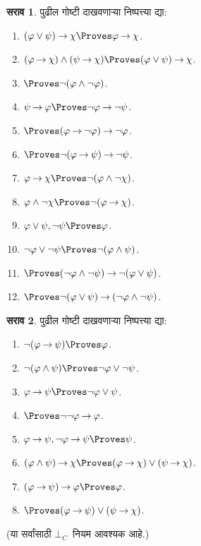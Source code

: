 \documentclass[11pt,a4paper,openany]{book}
\theoremstyle{definition}
\newtheorem{prob}{सराव}[chapter]
\newcommand{\lif}{\mathbin{\to}}
\newcommand{\lfalse}{\bot}
\newcommand{\FalseCl}{\ensuremath{\lfalse_C}}
\begin{document}
\begin{prob}
पुढील गोष्टी दाखवणाऱ्या निष्पत्त्या द्या:
\begin{enumerate}
\item $(\varphi \lor \psi) \lif \chi \Proves \varphi \lif \chi$.
\item $(\varphi \lif \chi) \land (\psi \lif \chi) \Proves (\varphi \lor \psi) \lif \chi$.
\item $\Proves \lnot(\varphi \land \lnot \varphi)$.
\item $\psi \lif \varphi \Proves \lnot \varphi \lif \lnot \psi$.
\item $\Proves (\varphi \lif \lnot \varphi) \lif \lnot \varphi$.
\item $\Proves \lnot(\varphi \lif \psi) \lif \lnot \psi$.
\item $\varphi \lif \chi \Proves \lnot (\varphi \land \lnot \chi)$.
\item $\varphi \land \lnot \chi \Proves \lnot (\varphi \lif \chi)$.
\item $\varphi \lor \psi, \lnot \psi \Proves \varphi$.
\item $\lnot \varphi \lor \lnot \psi \Proves \lnot(\varphi \land \psi)$.
\item $\Proves (\lnot \varphi \land \lnot \psi) \lif\lnot(\varphi \lor \psi)$.
\item $\Proves \lnot(\varphi \lor \psi) \lif (\lnot \varphi \land \lnot \psi)$.
\end{enumerate}
\end{prob}

\begin{prob}
पुढील गोष्टी दाखवणाऱ्या निष्पत्त्या द्या:
\begin{enumerate}
\item $\lnot(\varphi \lif \psi) \Proves \varphi$.
\item $\lnot(\varphi \land \psi) \Proves \lnot \varphi \lor \lnot \psi$.
\item $\varphi \lif \psi \Proves \lnot \varphi \lor \psi$.
\item $\Proves \lnot \lnot \varphi \lif \varphi$.
\item $\varphi \lif \psi, \lnot \varphi \lif \psi \Proves \psi$.
\item $(\varphi \land \psi) \lif \chi \Proves (\varphi \lif \chi) \lor (\psi \lif \chi)$.
\item $(\varphi \lif \psi) \lif \varphi \Proves \varphi$.
\item $\Proves (\varphi \lif \psi) \lor (\psi \lif \chi)$.
\end{enumerate}
(या सर्वांसाठी $\FalseCl$~नियम आवश्यक आहे.)
\end{prob}
\end{document}
